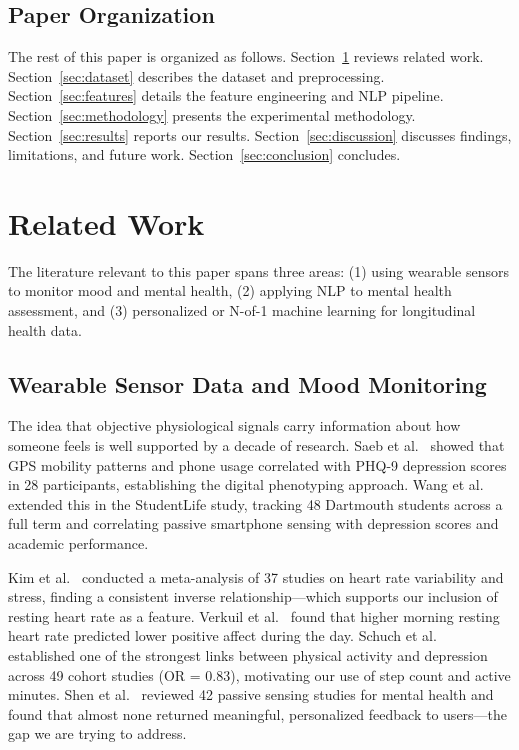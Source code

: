 \documentclass[conference]{IEEEtran}
\begin{document}
\subsection{Paper Organization}

The rest of this paper is organized as follows. Section~\ref{sec:related} reviews related work. Section~\ref{sec:dataset} describes the dataset and preprocessing. Section~\ref{sec:features} details the feature engineering and NLP pipeline. Section~\ref{sec:methodology} presents the experimental methodology. Section~\ref{sec:results} reports our results. Section~\ref{sec:discussion} discusses findings, limitations, and future work. Section~\ref{sec:conclusion} concludes.

\section{Related Work}
\label{sec:related}

The literature relevant to this paper spans three areas: (1) using wearable sensors to monitor mood and mental health, (2) applying NLP to mental health assessment, and (3) personalized or N-of-1 machine learning for longitudinal health data.

\subsection{Wearable Sensor Data and Mood Monitoring}

The idea that objective physiological signals carry information about how someone feels is well supported by a decade of research. Saeb et al.~\cite{saeb2015} showed that GPS mobility patterns and phone usage correlated with PHQ-9 depression scores in 28 participants, establishing the digital phenotyping approach. Wang et al.~\cite{wang2014studentlife} extended this in the StudentLife study, tracking 48 Dartmouth students across a full term and correlating passive smartphone sensing with depression scores and academic performance.

Kim et al.~\cite{kim2018} conducted a meta-analysis of 37 studies on heart rate variability and stress, finding a consistent inverse relationship---which supports our inclusion of resting heart rate as a feature. Verkuil et al.~\cite{verkuil2016} found that higher morning resting heart rate predicted lower positive affect during the day. Schuch et al.~\cite{schuch2018} established one of the strongest links between physical activity and depression across 49 cohort studies (OR = 0.83), motivating our use of step count and active minutes. Shen et al.~\cite{shen2023} reviewed 42 passive sensing studies for mental health and found that almost none returned meaningful, personalized feedback to users---the gap we are trying to address.
\end{document}

